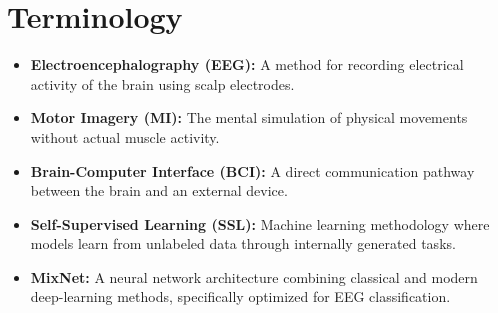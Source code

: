 \section{Terminology}
\label{sec:terminology}

\begin{itemize}
    \item \textbf{Electroencephalography (EEG):} A method for recording electrical activity of the brain using scalp electrodes.
    \item \textbf{Motor Imagery (MI):} The mental simulation of physical movements without actual muscle activity.
    \item \textbf{Brain-Computer Interface (BCI):} A direct communication pathway between the brain and an external device.
    \item \textbf{Self-Supervised Learning (SSL):} Machine learning methodology where models learn from unlabeled data through internally generated tasks.
    \item \textbf{MixNet:} A neural network architecture combining classical and modern deep-learning methods, specifically optimized for EEG classification.
\end{itemize}
